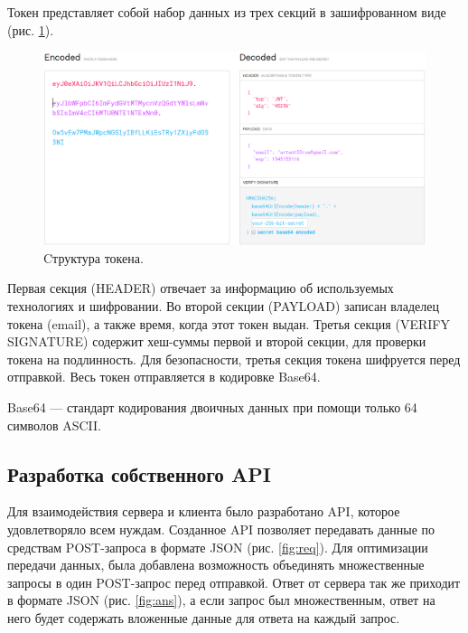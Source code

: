 Токен представляет собой набор данных из трех секций в зашифрованном виде (рис. \ref{fig:token1}).

\begin{figure}[h]
    \centering
    \includegraphics[width=1\linewidth]{img/token1.png}
    \caption{Cтруктура токена.}
    \label{fig:token1}
\end{figure}
Первая секция (HEADER) отвечает за информацию об используемых технологиях и шифровании. Во второй секции (PAYLOAD) записан владелец токена (email), а также время, когда этот токен выдан. Третья секция (VERIFY SIGNATURE) содержит хеш-суммы первой и второй секции, для проверки токена на подлинность. Для безопасности, третья секция токена шифруется перед отправкой. Весь токен отправляется в кодировке Base64.

Base64 --- стандарт кодирования двоичных данных при помощи только 64 символов ASCII.


\clearpage
\subsection{Разработка собственного API}
Для взаимодействия сервера и клиента было разработано API, которое удовлетворяло всем нуждам. Созданное API позволяет передавать данные по средствам POST-запроса в формате JSON (рис. \ref{fig:req}). Для оптимизации передачи данных, была добавлена возможность объединять множественные запросы в один POST-запрос перед отправкой. Ответ от сервера так же приходит в формате JSON (рис. \ref{fig:ans}), а если запрос был множественным, ответ на него будет содержать вложенные данные для ответа на каждый запрос.

